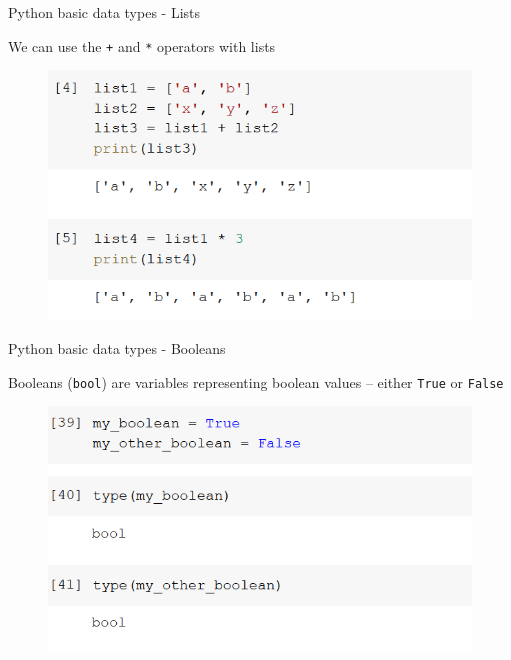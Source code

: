 \documentclass[aspectratio=169]{beamer}
\begin{document}
\begin{frame}{Python basic data types - Lists}

	We can use the \texttt{+} and \texttt{*} operators with lists

	\begin{figure}
		\centering
		\includegraphics[width=0.6\linewidth]{img/list_operations.png}
	\end{figure}

\end{frame}

\begin{frame}{Python basic data types - Booleans}

	Booleans (\texttt{bool}) are variables representing boolean values -- either \texttt{True} or \texttt{False}

	\begin{figure}
		\centering
		\includegraphics[width=0.6\linewidth]{img/bool.png}
	\end{figure}

\end{frame}
\end{document}
